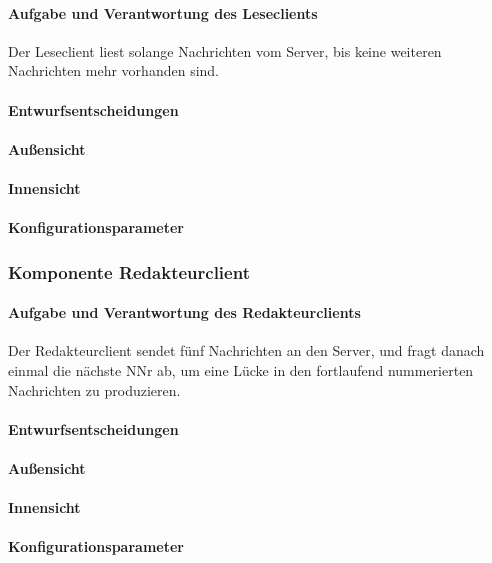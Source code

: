 \documentclass{article}
\begin{document}
    		\paragraph{Aufgabe und Verantwortung des Leseclients}
    		Der Leseclient liest solange Nachrichten vom Server, 
    		bis keine weiteren Nachrichten mehr vorhanden sind.
			\paragraph{Entwurfsentscheidungen}
			\paragraph{Außensicht}
			\paragraph{Innensicht}
			\paragraph{Konfigurationsparameter}
		
		\subsubsection{Komponente Redakteurclient}
		
		    \paragraph{Aufgabe und Verantwortung des Redakteurclients}
		    Der Redakteurclient sendet fünf Nachrichten an den Server, 
		    und fragt danach einmal die nächste NNr ab, um eine Lücke in den fortlaufend 
		    nummerierten Nachrichten zu produzieren.
			\paragraph{Entwurfsentscheidungen}
			\paragraph{Außensicht}
			\paragraph{Innensicht}
			\paragraph{Konfigurationsparameter}
			
\end{document}
